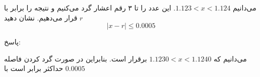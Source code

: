 می‌دانیم
$ 1.123 < x < 1.124$.
این عدد را تا ۳ رقم اعشار گرد می‌کنیم و نتیجه را برابر با $r$ قرار می‌دهیم. نشان دهید 
$$|x - r| \leq 0.0005$$


پاسخ:

می‌دانیم که 
$1.1230 < x < 1.1240$
برقرار است. بنابراین در صورت گرد کردن فاصله حداکثر برابر است با
$0.0005$